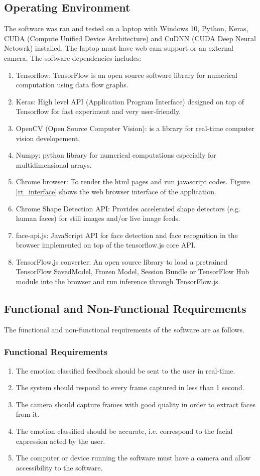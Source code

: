 \documentclass[master]{thesis-uestc}
\begin{document}
\subsection*{Operating Environment}
The software was ran and tested on a laptop with Windows 10, Python, Keras, CUDA (Compute Unified Device Architecture) and CuDNN (CUDA Deep Neural Netowrk) installed. The laptop must have web cam support or an external camera. The software dependencies includes:
\begin{enumerate}
    \item Tensorflow: TensorFlow is an open source software library for numerical computation using data flow graphs.
    \item Keras: High level API (Application Program Interface) designed on top of Tensorflow for fast experiment and very user-friendly.
    \item OpenCV (Open Source Computer Vision): is a library for real-time computer vision developement.
    \item Numpy: python library for numerical computations especially for multidimensional arrays.
    \item Chrome browser: To render the html pages and run javascript codes. Figure \ref{rt_interface} shows the web browser interface of the application.
    \item Chrome Shape Detection API: Provides accelerated shape detectors (e.g. human faces) for still images and/or live image feeds.
    \item face-api.js: JavaScript API for face detection and face recognition in the browser implemented on top of the tensorflow.js core API.
    \item TensorFlow.js converter: An open source library to load a pretrained TensorFlow SavedModel, Frozen Model, Session Bundle or TensorFlow Hub module into the browser and run inference through TensorFlow.js.
\end{enumerate}

\subsection*{Functional and Non-Functional Requirements}
The functional and non-functional requirements of the software are as follows.

\subsubsection*{Functional Requirements}
\begin{enumerate}
    \item The emotion classified feedback should be sent to the user in real-time.
    \item The system should respond to every frame captured in less than 1 second.
    \item The camera should capture frames with good quality in order to extract faces from it.
    \item The emotion classified should be accurate, i.e. correspond to the facial expression acted by the user.
    \item The computer or device running the software must have a camera and allow accessibility to the software.
\end{enumerate}
\end{document}
